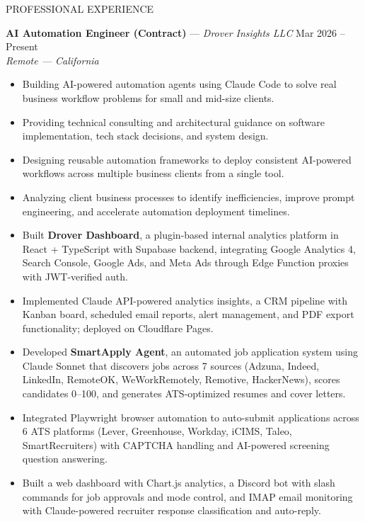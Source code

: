 \documentclass{resume}
\begin{document}
\begin{rSection}{PROFESSIONAL EXPERIENCE}

\textbf{AI Automation Engineer (Contract)} --- \textit{Drover Insights LLC} \hfill Mar 2026 -- Present \\
\textit{Remote --- California}
\begin{itemize}
    \item Building AI-powered automation agents using Claude Code to solve real business workflow problems for small and mid-size clients.
    \item Providing technical consulting and architectural guidance on software implementation, tech stack decisions, and system design.
    \item Designing reusable automation frameworks to deploy consistent AI-powered workflows across multiple business clients from a single tool.
    \item Analyzing client business processes to identify inefficiencies, improve prompt engineering, and accelerate automation deployment timelines.
    \item Built \textbf{Drover Dashboard}, a plugin-based internal analytics platform in React + TypeScript with Supabase backend, integrating Google Analytics 4, Search Console, Google Ads, and Meta Ads through Edge Function proxies with JWT-verified auth.
    \item Implemented Claude API-powered analytics insights, a CRM pipeline with Kanban board, scheduled email reports, alert management, and PDF export functionality; deployed on Cloudflare Pages.
    \item Developed \textbf{SmartApply Agent}, an automated job application system using Claude Sonnet that discovers jobs across 7 sources (Adzuna, Indeed, LinkedIn, RemoteOK, WeWorkRemotely, Remotive, HackerNews), scores candidates 0--100, and generates ATS-optimized resumes and cover letters.
    \item Integrated Playwright browser automation to auto-submit applications across 6 ATS platforms (Lever, Greenhouse, Workday, iCIMS, Taleo, SmartRecruiters) with CAPTCHA handling and AI-powered screening question answering.
    \item Built a web dashboard with Chart.js analytics, a Discord bot with slash commands for job approvals and mode control, and IMAP email monitoring with Claude-powered recruiter response classification and auto-reply.
\end{itemize}


\end{rSection}
\end{document}
